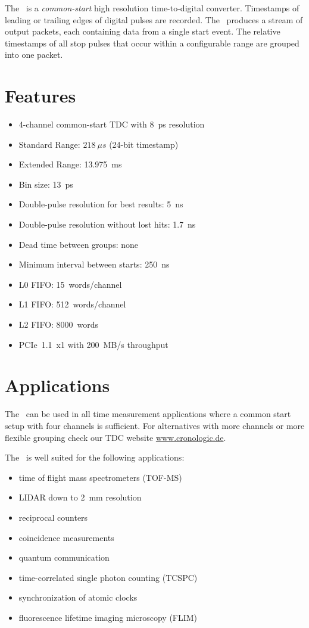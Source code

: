 The \deviceName\ is a \emph{common-start} high resolution time-to-digital converter. 
Timestamps of leading or trailing edges of digital pulses are recorded. 
The \deviceName\ produces a stream of output packets, each containing data from a single start event. 
The relative timestamps of all stop pulses that occur within a configurable range are grouped into one packet.

\section{Features}
	\begin{itemize}
		\item 4-channel common-start TDC with 8~ps resolution
		\item Standard Range: $218~\mu s$ (24-bit timestamp)
		\item Extended Range: 13.975~ms
		\item Bin size: 13~ps
		\item Double-pulse resolution for best results: 5~ns
		\item Double-pulse resolution without lost hits: 1.7~ns
		\item Dead time between groups: none
		\item Minimum interval between starts: 250~ns
		\item L0 FIFO: 15~words/channel
		\item L1 FIFO: 512~words/channel
		\item L2 FIFO: 8000~words
		\item PCIe~1.1~x1 with 200~MB/s throughput
	\end{itemize} 
\section{Applications}
The \deviceName\ can be used in all time measurement applications where a common start setup with four channels is sufficient. 
For alternatives with more channels or more flexible grouping check our TDC website \href{https://www.cronologic.de/produkte/products-overview#tdcdata}{www.cronologic.de}.

The \deviceName\ is well suited for the following applications:
\begin{itemize}
	\item time of flight mass spectrometers (TOF-MS)
	\item LIDAR down to 2~mm resolution
	\item reciprocal counters
	\item coincidence measurements
	\item quantum communication
	\item time-correlated single photon counting (TCSPC)
	\item synchronization of atomic clocks
	\item fluorescence lifetime imaging microscopy (FLIM)
\end{itemize} 